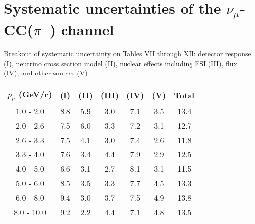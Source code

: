 \documentclass[aps, prd, reprint,showpacs,  preprintnumbers,amsmath,amssymb,superscriptaddress, nofootinbib]{revtex4-1}
\makeatletter
\newcommand{\anumu}{\ensuremath{\bar{\nu}_{\mu}}}
\renewenvironment{table}
  {\def\@captype{table}}
  {}
\makeatother
\begin{document}







\onecolumngrid
\newpage
\section{Systematic uncertainties of the $\anumu$-CC($\pi^{-}$) channel}


Breakout of systematic uncertainty on Tables VII through XII: detector response (I), 
neutrino cross section model (II), nuclear effects including FSI (III), flux (IV), and other sources (V). 

\vspace{0.5cm}

\begin{table}
\centering
\begin{tabular}{ccccccc}
\hline
$p_{\mu}$ (GeV/c) & (I) & (II) & (III) & (IV) & (V) & Total \\
\hline
  1.0 -   2.0  & 8.8  & 5.9  & 3.0  & 7.1  & 3.5  &13.4 \\
  2.0 -   2.6  & 7.5  & 6.0  & 3.3  & 7.2  & 3.1  &12.7 \\
  2.6 -   3.3  & 7.5  & 4.1  & 3.0  & 7.4  & 2.6  &11.8 \\
  3.3 -   4.0  & 7.6  & 3.4  & 4.4  & 7.9  & 2.9  &12.5 \\
  4.0 -   5.0  & 6.6  & 3.1  & 2.7  & 8.1  & 3.1  &11.5 \\
  5.0 -   6.0  & 8.5  & 3.5  & 3.3  & 7.7  & 4.5  &13.3 \\
  6.0 -   8.0  & 9.4  & 3.0  & 3.7  & 7.5  & 4.9  &13.8 \\
  8.0 -  10.0  & 9.2  & 2.2  & 4.4  & 7.1  & 4.8  &13.5 \\
\hline
\hline
\end{tabular}
\caption{Fractional systematic uncertainties (in percent) for $d\sigma/dp_\mu$.}
\label{tb:syst-muon-momentum}
\end{table}
\end{document}
